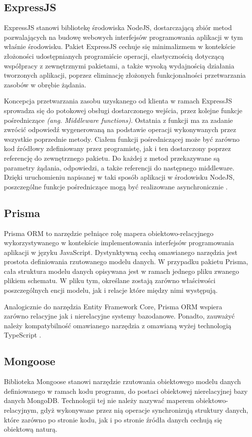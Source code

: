 \subsection*{ExpressJS}
ExpressJS stanowi bibliotekę środowiska NodeJS, dostarczającą zbiór metod pozwalających na budowę webowych interfejsów programowania aplikacji w tym właśnie środowisku. Pakiet ExpressJS cechuje się minimalizmem w kontekście złożoności udostępnianych programiście operacji, elastycznością dotyczącą współpracy z zewnętrznymi pakietami, a także wysoką wydajnością działania tworzonych aplikacji, poprzez eliminację złożonych funkcjonalności przetwarzania zasobów w obrębie żądania.

Koncepcja przetwarzania zasobu uzyskanego od klienta w ramach ExpressJS sprowadza się do potokowej obsługi dostarczonego wejścia, przez kolejne funkcje pośredniczące \textit{(ang. Middleware functions)}. Ostatnia z funkcji ma za zadanie zwrócić odpowiedź wygenerowaną na podstawie operacji wykonywanych przez wszystkie poprzednie metody. Ciałem funkcji pośredniczącej może być zarówno kod źródłowy zdefiniowany przez programistę, jak i ten dostarczony poprzez referencję do zewnętrznego pakietu. Do każdej z metod przekazywane są parametry żądania, odpowiedzi, a także referencji do następnego middleware. Dzięki uruchomieniu napisanej w taki sposób aplikacji w środowisku NodeJS, poszczególne funkcje pośredniczące mogą być realizowane asynchronicznie \cite{mardan2014express}.
\subsection*{Prisma}
Prisma ORM to narzędzie pełniące rolę mapera obiektowo-relacyjnego wykorzystywanego w kontekście implementowania interfejsów programowania aplikacji w języku JavaScript. Dystynktywną cechą omawianego narzędzia jest prostota definiowania rzutowanego modelu danych. W przypadku pakietu Prisma, cała struktura modelu danych opisywana jest w ramach jednego pliku zwanego plikiem schematu. W pliku tym, określane zostają zarówno właściwości poszczególnych encji modelu, jak i relacje które między nimi występują.

Analogicznie do narzędzia Entity Framework Core, Prisma ORM wspiera zarówno relacyjne jak i nierelacyjne systemy bazodanowe. Ponadto, zauważyć należy kompatybilność omawianego narzędzia z omawianą wyżej technologią TypeScript \cite{prisma}.
\subsection*{Mongoose}
Biblioteka Mongoose stanowi narzędzie rzutowania obiektowego modelu danych definiowanego w ramach kodu programu, do postaci obiektowej nierelacyjnej bazy danych MongoDB. Technologii tej nie należy nazywać maperem obiektowo-relacyjnym, gdyż wykonywane przez nią operacje synchronizują struktury danych, które zarówno po stronie kodu, jak i po stronie źródła danych cechują się obiektową naturą.

